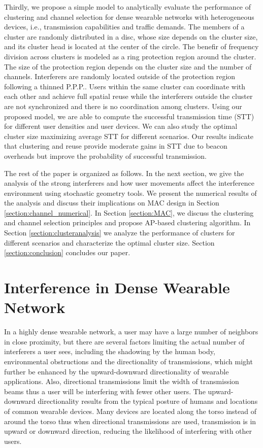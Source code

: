 \documentclass[10pt, conference, letterpaper]{IEEEtran}
\begin{document}
Thirdly, we propose a simple model to analytically evaluate the performance of clustering and channel selection for dense wearable networks with heterogeneous devices, i.e., transmission capabilities and traffic demands. The members of a cluster are randomly distributed in a disc, whose size depends on the cluster size, and its cluster head is located at the center of the circle. The benefir of frequency division across clusters is modeled as a ring protection region around the cluster. The size of the protection region depends on the cluster size and the number of channels. Interferers are randomly located outside of the protection region following a thinned P.P.P.. Users within the same cluster can coordinate with each other and achieve full spatial reuse while the interferers outside the cluster are not synchronized and there is no coordination among clusters. Using our proposed model, we are able to compute the successful transmission time (STT) for different user densities and user devices. We can also study the optimal cluster size maximizing average STT for different scenarios. Our results indicate that clustering and reuse provide moderate gains in STT due to beacon overheads but improve the probability of successful transmission. 

The rest of the paper is organized as follows. In the next section, we give the analysis of the strong interferers and how user movements affect the interference environment using stochastic geometry tools. We present the numerical results of the analysis and discuss their implications on MAC design in Section \ref{section:channel_numerical}. In Section \ref{section:MAC}, we discuss the clustering and channel selection principles and propose AP-based clustering algorithm. In Section \ref{section:clusteranalysis} we analyze the performance of clusters for different scenarios and characterize the optimal cluster size. Section \ref{section:conclusion} concludes our paper. 

\section{Interference in Dense Wearable Network}\label{section:channel}
In a highly dense wearable network, a user may have a large number of neighbors in close proximity, but there are several factors limiting the actual number of interferers a user sees, including the shadowing by the human body, environmental obstructions and the directionality of transmissions, which might further be enhanced by the upward-downward directionality of wearable applications. Also, directional transmissions limit the width of transmission beams thus a user will be interfering with fewer other users. The upward-downward directionality results from the typical posture of humans and locations of common wearable devices. Many devices are located along the torso instead of around the torso thus when directional transmissions are used, transmission is in upward or downward direction, reducing the likelihood of interfering with other users. 
\end{document}
